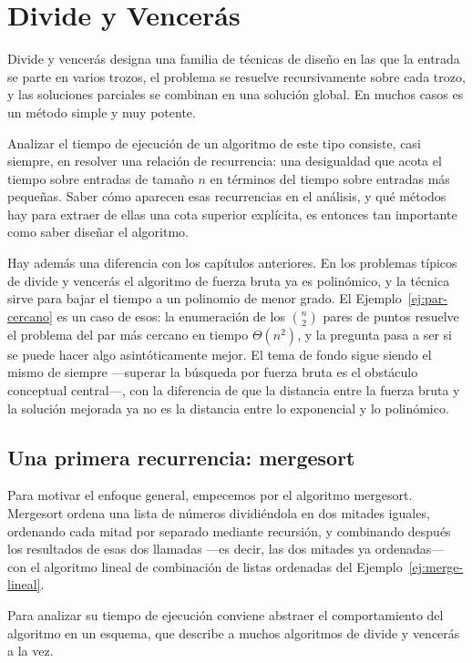 \documentclass[12pt, spanish, oneside, openany]{book}
\theoremstyle{uprightplain}
\theoremstyle{definition}
\theoremstyle{remark}
\theoremstyle{definition}
\begin{document}
\chapter{Divide y Vencerás}
\label{chap:divide}

Divide y vencerás designa una familia de técnicas de diseño en las que la entrada se parte en varios trozos, el problema se resuelve recursivamente sobre cada trozo, y las soluciones parciales se combinan en una solución global. En muchos casos es un método simple y muy potente.

Analizar el tiempo de ejecución de un algoritmo de este tipo consiste, casi siempre, en resolver una relación de recurrencia: una desigualdad que acota el tiempo sobre entradas de tamaño $n$ en términos del tiempo sobre entradas más pequeñas. Saber cómo aparecen esas recurrencias en el análisis, y qué métodos hay para extraer de ellas una cota superior explícita, es entonces tan importante como saber diseñar el algoritmo.

Hay además una diferencia con los capítulos anteriores. En los problemas típicos de divide y vencerás el algoritmo de fuerza bruta ya es polinómico, y la técnica sirve para bajar el tiempo a un polinomio de menor grado. El Ejemplo~\ref{ej:par-cercano} es un caso de esos: la enumeración de los $\binom{n}{2}$ pares de puntos resuelve el problema del par más cercano en tiempo $\Theta(n^2)$, y la pregunta pasa a ser si se puede hacer algo asintóticamente mejor. El tema de fondo sigue siendo el mismo de siempre ---superar la búsqueda por fuerza bruta es el obstáculo conceptual central---, con la diferencia de que la distancia entre la fuerza bruta y la solución mejorada ya no es la distancia entre lo exponencial y lo polinómico.


\section{Una primera recurrencia: mergesort}
\label{sec:rec-mergesort}

Para motivar el enfoque general, empecemos por el algoritmo mergesort. Mergesort ordena una lista de números dividiéndola en dos mitades iguales, ordenando cada mitad por separado mediante recursión, y combinando después los resultados de esas dos llamadas ---es decir, las dos mitades ya ordenadas--- con el algoritmo lineal de combinación de listas ordenadas del Ejemplo~\ref{ej:merge-lineal}.

Para analizar su tiempo de ejecución conviene abstraer el comportamiento del algoritmo en un esquema, que describe a muchos algoritmos de divide y vencerás a la vez.
\end{document}
